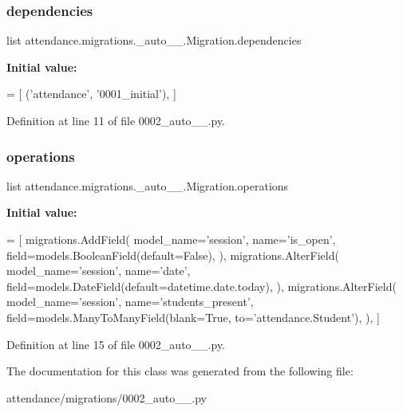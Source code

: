 \subsubsection{\texorpdfstring{dependencies}{dependencies}}
{\footnotesize\ttfamily list attendance.\+migrations.\+\_\+auto\+\_\+\_.\+Migration.\+dependencies\hspace{0.3cm}{\ttfamily [static]}}

{\bfseries Initial value\+:}
\begin{DoxyCode}
=  [
        (\textcolor{stringliteral}{'attendance'}, \textcolor{stringliteral}{'0001\_initial'}),
    ]
\end{DoxyCode}


Definition at line 11 of file 0002\+\_\+auto\+\_\+\_.\+py.

\hypertarget{classattendance_1_1migrations_1_10002__auto__20160902__1307_1_1_migration_ac38b78fd314fb71afae3286f5016cd90}{}\label{classattendance_1_1migrations_1_10002__auto__20160902__1307_1_1_migration_ac38b78fd314fb71afae3286f5016cd90} 
\subsubsection{\texorpdfstring{operations}{operations}}
{\footnotesize\ttfamily list attendance.\+migrations.\+\_\+auto\+\_\+\_.\+Migration.\+operations\hspace{0.3cm}{\ttfamily [static]}}

{\bfseries Initial value\+:}
\begin{DoxyCode}
=  [
        migrations.AddField(
            model\_name=\textcolor{stringliteral}{'session'},
            name=\textcolor{stringliteral}{'is\_open'},
            field=models.BooleanField(default=\textcolor{keyword}{False}),
        ),
        migrations.AlterField(
            model\_name=\textcolor{stringliteral}{'session'},
            name=\textcolor{stringliteral}{'date'},
            field=models.DateField(default=datetime.date.today),
        ),
        migrations.AlterField(
            model\_name=\textcolor{stringliteral}{'session'},
            name=\textcolor{stringliteral}{'students\_present'},
            field=models.ManyToManyField(blank=\textcolor{keyword}{True}, to=\textcolor{stringliteral}{'attendance.Student'}),
        ),
    ]
\end{DoxyCode}


Definition at line 15 of file 0002\+\_\+auto\+\_\+\_.\+py.



The documentation for this class was generated from the following file\+:\begin{DoxyCompactItemize}
\item 
attendance/migrations/0002\+\_\+auto\+\_\+\_.\+py\end{DoxyCompactItemize}
